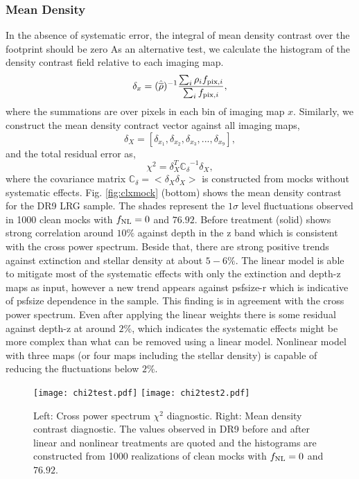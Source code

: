 \subsubsection{Mean Density}
In the absence of systematic error, the integral of mean density contrast over the footprint should be zero As an alternative test, we calculate the histogram of the density contrast field relative to each imaging map.
\begin{equation}
\delta_{x} = ({\hat{\overline{\rho}}})^{-1} \frac{\sum_{i} \rho_{i} f_{{\rm pix}, i}}{\sum_{i} f_{{\rm pix}, i}},
\end{equation}
where the summations are over pixels in each bin of imaging map $x$. Similarly, we construct the mean density contract vector against all imaging maps,
\begin{equation}
\delta_{X} = [\delta_{x_{1}}, \delta_{x_{2}}, \delta_{x_{3}}, ..., \delta_{x_{9}}],
\end{equation}
and the total residual error as,
\begin{equation}
\chi^{2} = \delta_{X}^{T} \mathbb{C_{\delta}}^{-1} \delta_{X},
\end{equation}
where the covariance matrix $\mathbb{C}_{\delta} = < \delta_{X} \delta_{X}>$ is constructed from mocks without systematic effects. Fig. \ref{fig:clxmock} (bottom) shows the mean density contrast for the DR9 LRG sample. The shades represent the $1\sigma$ level fluctuations observed in 1000 clean mocks with $f_{\rm NL}=0$ and $76.92$. Before treatment (solid) shows strong correlation around $10\%$ against depth in the z band which is consistent with the cross power spectrum. Beside that, there are strong positive trends against extinction and stellar density at about $5-6\%$. The linear model is able to mitigate most of the systematic effects with only the extinction and depth-z maps as input, however a new trend appears against psfsize-r which is indicative of psfsize dependence in the sample. This finding is in agreement with the cross power spectrum. Even after applying the linear weights there is some residual against depth-z at around $2\%$, which indicates the systematic effects might be more complex than what can be removed using a linear model. Nonlinear model with three maps (or four maps including the stellar density) is capable of reducing the fluctuations below $2\%$. 

\begin{figure*}
\centering
\texttt{[image: chi2test.pdf]}
\texttt{[image: chi2test2.pdf]}
\caption{Left: Cross power spectrum $\chi^{2}$ diagnostic. Right: Mean density contrast diagnostic. The values observed in DR9 before and after linear and nonlinear treatments are quoted and the histograms are constructed from 1000 realizations of clean mocks with $f_{\rm NL}=0$ and $76.92$.}\label{fig:chi2test}
\end{figure*}


